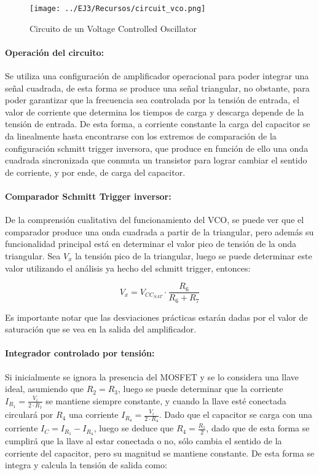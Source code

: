 \begin{figure}[H]
    \centering
        \texttt{[image: ../EJ3/Recursos/circuit\_vco.png]}
    \caption{Circuito de un Voltage Controlled Oscillator}
    \label{fig:circuito_vco}
\end{figure}

\paragraph{Operaci\'on del circuito:} Se utiliza una configuraci\'on de amplificador operacional para poder integrar una se\~nal cuadrada,
de esta forma se produce una se\~nal triangular, no obstante, para poder garantizar que la frecuencia sea controlada por la tensi\'on de entrada,
el valor de corriente que determina los tiempos de carga y descarga depende de la tensi\'on de entrada. De esta forma, a corriente constante la carga del capacitor
se da linealmente hasta encontrarse con los extremos de comparaci\'on de la configuraci\'on schmitt trigger inversora, que produce en funci\'on de ello una onda
cuadrada sincronizada que conmuta un transistor para lograr cambiar el sentido de corriente, y por ende, de carga del capacitor.

\paragraph{Comparador Schmitt Trigger inversor:} De la comprensi\'on cualitativa del funcionamiento del VCO, se puede ver que el comparador
produce una onda cuadrada a partir de la triangular, pero adem\'as su funcionalidad principal est\'a en determinar el valor pico de tensi\'on de la onda triangular.
Sea $V_x$ la tensi\'on pico de la triangular, luego se puede determinar este valor utilizando el an\'alisis ya hecho del schmitt trigger, entonces:

\begin{equation}
    V_x = V_{CC_{SAT}} \cdot \frac{R_6}{R_6 + R_7}
    \label{eq:ecuacion_tensiones_vco}
\end{equation}

Es importante notar que las desviaciones pr\'acticas estar\'an dadas por el valor de saturaci\'on que se vea en la salida del amplificador.

\paragraph{Integrador controlado por tensi\'on:} Si inicialmente se ignora la presencia del MOSFET y se lo considera una llave ideal, asumiendo que $R_2 = R_3$,
luego se puede determinar que la corriente $I_{R_1} = \frac{V_i}{2 \cdot R_1}$ se mantiene siempre constante, y cuando la llave est\'e conectada circular\'a por $R_4$ una corriente $I_{R_4} = \frac{V_i}{2 \cdot R_4}$. Dado que el capacitor se carga con una corriente $I_C = I_{R_1} - I_{R_4}$, luego
se deduce que $R_4 = \frac{R_1}{2}$, dado que de esta forma se cumplir\'a que la llave al estar conectada o no, s\'olo cambia el sentido de la corriente del capacitor,
pero su magnitud se mantiene constante. De esta forma se integra y calcula la tensi\'on de salida como:

